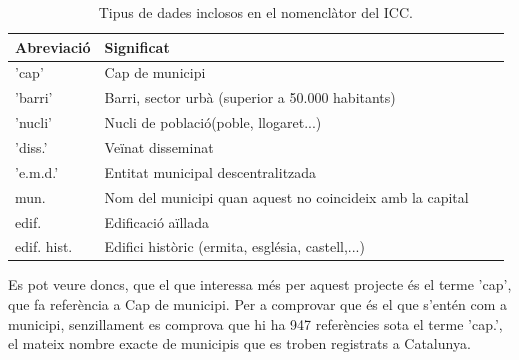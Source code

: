 \documentclass[12pt,a4paper,openright,oneside]{article}
\numberwithin{equation}{section}
\theoremstyle{definition}
\begin{document}
\begin{table}[htbp]
\begin{center}
	\centering
    \begin{tabular}{| l | l | l | l |}
    \hline
    \textbf{Abreviació} & \textbf{Significat} \\ \hline
    'cap' & Cap de municipi \\ \hline
	'barri' & Barri, sector urbà (superior a 50.000 habitants)\\ \hline
	'nucli' & Nucli de població(poble, llogaret...)\\ \hline
	'diss.' & Veïnat disseminat \\ \hline
	'e.m.d.' & Entitat municipal descentralitzada \\ \hline
	mun. & Nom del municipi quan aquest no coincideix amb la capital \\ \hline
	edif. & Edificació aïllada\\ \hline
	edif. hist. & Edifici històric (ermita, església, castell,...)\\ \hline
    \end{tabular}
\end{center}
\caption{Tipus de dades inclosos en el nomenclàtor del ICC.}
\end{table}
Es pot veure doncs, que el que interessa més per aquest projecte és el terme 'cap', que fa referència a Cap de municipi. Per a comprovar que és el que s'entén com a municipi, senzillament es comprova que hi ha 947 referències sota el terme 'cap.', el mateix nombre exacte de municipis que es troben registrats a Catalunya.
\end{document}
